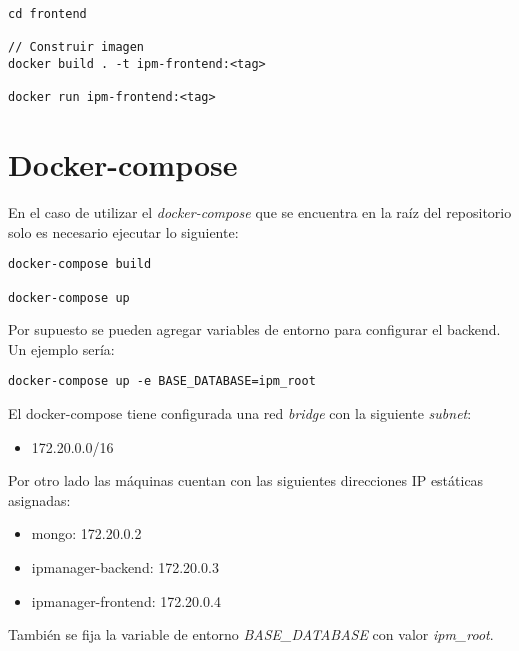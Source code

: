 \begin{lstlisting}
cd frontend

// Construir imagen
docker build . -t ipm-frontend:<tag>

docker run ipm-frontend:<tag>
\end{lstlisting}



\section{Docker-compose}

En el caso de utilizar el \textit{docker-compose} que se encuentra en la raíz del repositorio solo es necesario ejecutar lo siguiente:

\begin{lstlisting}
docker-compose build

docker-compose up
\end{lstlisting}

Por supuesto se pueden agregar variables de entorno para configurar el backend. Un ejemplo sería:

\begin{lstlisting}
docker-compose up -e BASE_DATABASE=ipm_root
\end{lstlisting}

El docker-compose tiene configurada una red \textit{bridge} con la siguiente \textit{subnet}:

\begin{itemize}
	\item 172.20.0.0/16
\end{itemize}

Por otro lado las máquinas cuentan con las siguientes direcciones IP estáticas asignadas:

\begin{itemize}
	\item mongo: 172.20.0.2
	\item ipmanager-backend: 172.20.0.3
	\item ipmanager-frontend: 172.20.0.4
\end{itemize}

También se fija la variable de entorno \textit{BASE\_DATABASE} con valor \textit{ipm\_root}.